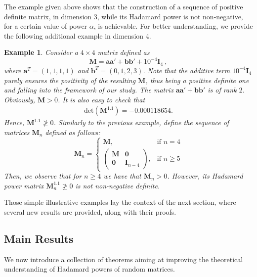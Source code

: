 \documentclass[conference,letterpaper]{IEEEtran}
\numberwithin{equation}{section}
\newcommand{\lbl}{\label}
\newcommand{\beaa}{\begin{eqnarray*}}
\newcommand{\eeaa}{\end{eqnarray*}}
\newtheorem{example}{{\sc Example}}[section]
\begin{document}
\medskip

The example given above shows that the construction of a sequence of positive definite matrix, in dimension $3$, while its Hadamard power is not non-negative, for a certain value of power $\alpha$, is achievable. 
For better understanding, we provide the following additional example in dimension $4$. 

\medskip

\begin{example}\lbl{good_example} 
Consider a $4\times 4$ matrix defined as 
$$\mathbf{M}=\mathbf{a}\mathbf{a}'+\mathbf{b}\mathbf{b}' + 10^{-4}\mathbf{I}_4 \ ,$$ 
where $\mathbf{a}^T=(1,1,1,1)$ and $\mathbf{b}^T=(0,1,2,3)$. 
Note that the additive term $10^{-4}\mathbf{I}_4$ purely ensures the positivity of the resulting $\mathbf{M}$, thus being a positive definite one and falling into the framework of our study.
The matrix $\mathbf{a}\mathbf{a}'+\mathbf{b}\mathbf{b}'$  is of rank $2$. Obviously, $\mathbf{M}>0$. 
It is also easy to check that
\beaa
\mbox{det}(\mathbf{M}^{1.1})=-0.000118654.
\eeaa
Hence, $\mathbf{M}^{1.1}\ngeqslant 0$.
Similarly to the previous example, define the sequence of matrices $\mathbf{M}_n$ defined as follows:
\[
    \mathbf{M}_n= 
\begin{cases}
    \mathbf{M},& \text{if } n=4\\
    \begin{pmatrix}
\mathbf{M} & \mathbf{0}\\
\mathbf{0} & \mathbf{I}_{n-4}
\end{pmatrix},              & \text{if } n\geq 5
\end{cases}
\]
Then, we observe that for $n\geq 4$ we have that $\mathbf{M}_n>0$. 
However, its Hadamard power matrix $\mathbf{M}_n^{1.1}\ngeqslant 0$ is not non-negative definite.
\end{example}
\medskip
Those simple illustrative examples lay the context of the next section, where several new results are provided, along with their proofs.

\subsection{Main Results}\lbl{Section_main}
We now introduce a collection of theorems aiming at improving the theoretical understanding of Hadamard powers of random matrices.
\end{document}
